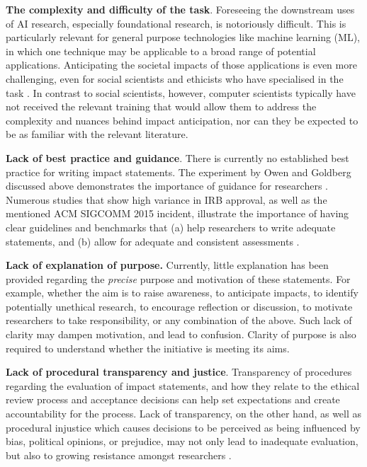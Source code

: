 \documentclass[11pt,english]{article}
\begin{document}
\textbf{The complexity and difficulty of the task}. Foreseeing the downstream uses of AI research, especially foundational research, is notoriously difficult. This is particularly relevant for general purpose technologies like machine learning (ML), in which one technique may be applicable to a broad range of potential applications. Anticipating the societal impacts of those applications is even more challenging, even for social scientists and ethicists
who have specialised in the task \citep{holbrook_peer_2011,european_commission_assessing_2005,spaapen_introducing_2011}. In contrast to social scientists, however, computer scientists typically have not received the relevant training that would allow them to address the complexity and nuances behind impact anticipation, nor can they be expected to be as familiar with the relevant literature. 

\textbf{Lack of best practice and guidance}. There is currently no established best practice for writing impact statements. The experiment by Owen and Goldberg discussed above demonstrates the importance of guidance for researchers \citep{owen_responsible_2010}. Numerous studies that show high variance in IRB approval, as well as the mentioned ACM SIGCOMM 2015 incident, illustrate the importance of having clear guidelines and benchmarks that (a) help researchers to write adequate statements, and (b) allow for adequate and consistent assessments \citep{dziak_variations_2005,larson_survey_2004,shah_how_2004,mcwilliams_problematic_2003}. 

\textbf{Lack of explanation of purpose.} Currently, little explanation has been provided regarding the \textit{precise} purpose and motivation of these statements. For example, whether the aim is to raise awareness, to anticipate impacts, to identify potentially unethical research, to encourage reflection or discussion, to motivate researchers to take responsibility, or any combination of the above. Such lack of clarity may dampen motivation, and lead to confusion. Clarity of purpose is also required to understand whether the initiative is meeting its aims.

\textbf{Lack of procedural transparency and justice}. Transparency of procedures regarding the evaluation of impact statements, and how they relate to the ethical review process and acceptance decisions can help set expectations and create accountability for the process. Lack of transparency, on the other hand, as well as procedural injustice which causes decisions to be perceived as being influenced by bias, political opinions, or prejudice, may not only lead to inadequate evaluation, but also to growing resistance amongst researchers \citep{keith-spiegel_what_2006}.
\end{document}
